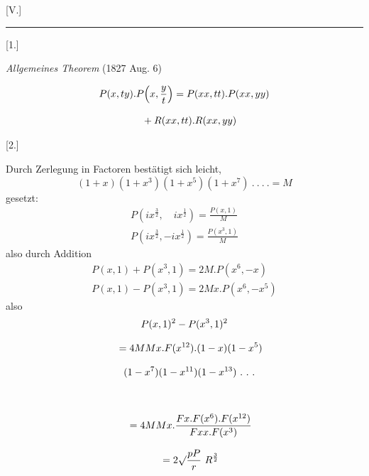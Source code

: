 \clearpage{}


\begin{center}[V.]\par\rule{.10\linewidth}{.3pt}\end{center}

\begin{center}[1.]\par\emph{Allgemeines Theorem} (1827 Aug. 6)\end{center}
\[
\begin{gathered}P(x,ty).P\Bigl(x,\frac yt\Bigr)=P(xx,tt).P(xx,yy)\\[8pt]\quad{}+R(xx,tt).R(xx,yy)\end{gathered}
\]

\par\medskip{}\centerline{[2.]}\nobreak\smallskip
Durch Zerlegung in Factoren bestätigt sich leicht,
\[
(1+x)(1+x^3)(1+x^5)(1+x^7)\ .\ .\ .\ .=M
\]
gesetzt:
\[
\begin{gathered}
P(ix^{\frac32},\quad ix^{\frac12})=\frac{P(x,1)}{M}\\[8pt]
P(ix^{\frac32},-ix^{\frac12})=\frac{P(x^3,1)}{M}
\end{gathered}
\]
also durch Addition
\[
\begin{gathered}
P(x,1)+P(x^3,1)=2M.P(x^6,-x)\\[8pt]
P(x,1)-P(x^3,1)=2Mx.P(x^6,-x^5)
\end{gathered}
\]
also
\[
\begin{gathered}
P(x,1)^2-P(x^3,1)^2
\\[8pt]\quad{}=4MMx.F(x^{12}).(1-x)(1-x^5)\\[8pt]\quad{}(1-x^7)(1-x^{11})(1-x^{13})\ .\ .\ .\\[8pt]
\\[8pt]\quad{}=4MMx.\frac{Fx.F(x^6).F(x^{12})}{Fxx.F(x^3)}
\\[8pt]\quad{}=2\surd\frac{pP}{r}\ R^{\frac32}
\end{gathered}
\]




